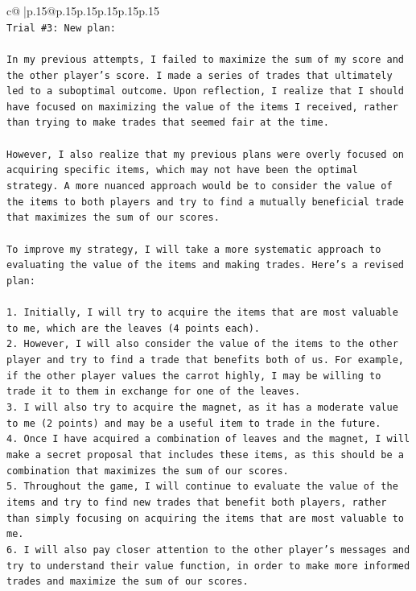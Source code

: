 \documentclass{article}
\begin{document}
{\begin{supertabular}{c@{$\;$}|p{.15\linewidth}@{}p{.15\linewidth}p{.15\linewidth}p{.15\linewidth}p{.15\linewidth}p{.15\linewidth}}
{{{\\ 
\texttt{Trial \#3: New plan: } \\
\\ 
\texttt{In my previous attempts, I failed to maximize the sum of my score and the other player's score. I made a series of trades that ultimately led to a suboptimal outcome. Upon reflection, I realize that I should have focused on maximizing the value of the items I received, rather than trying to make trades that seemed fair at the time.} \\
\\ 
\texttt{However, I also realize that my previous plans were overly focused on acquiring specific items, which may not have been the optimal strategy. A more nuanced approach would be to consider the value of the items to both players and try to find a mutually beneficial trade that maximizes the sum of our scores.} \\
\\ 
\texttt{To improve my strategy, I will take a more systematic approach to evaluating the value of the items and making trades. Here's a revised plan:} \\
\\ 
\texttt{1. Initially, I will try to acquire the items that are most valuable to me, which are the leaves (4 points each).} \\
\texttt{2. However, I will also consider the value of the items to the other player and try to find a trade that benefits both of us. For example, if the other player values the carrot highly, I may be willing to trade it to them in exchange for one of the leaves.} \\
\texttt{3. I will also try to acquire the magnet, as it has a moderate value to me (2 points) and may be a useful item to trade in the future.} \\
\texttt{4. Once I have acquired a combination of leaves and the magnet, I will make a secret proposal that includes these items, as this should be a combination that maximizes the sum of our scores.} \\
\texttt{5. Throughout the game, I will continue to evaluate the value of the items and try to find new trades that benefit both players, rather than simply focusing on acquiring the items that are most valuable to me.} \\
\texttt{6. I will also pay closer attention to the other player's messages and try to understand their value function, in order to make more informed trades and maximize the sum of our scores.} \\
}}}
\end{supertabular}}
\end{document}
